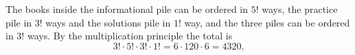 The books inside the informational pile can be ordered in $5!$ ways, the practice pile in $3!$ ways and the solutions pile in $1!$ way, and the three piles can be ordered in $3!$ ways. By the multiplication principle the total is
\[
3!\cdot5!\cdot3!\cdot1!=6\cdot120\cdot6=\boxed{4320}.
\]
